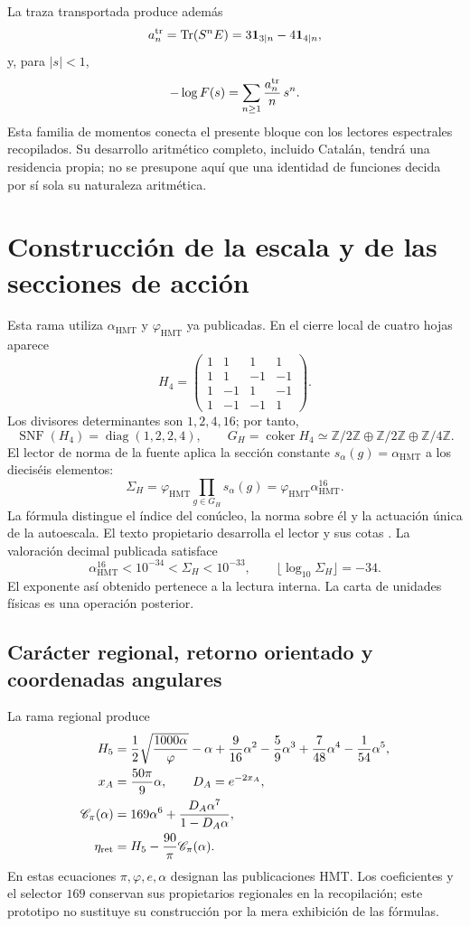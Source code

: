 \documentclass[11pt,a4paper]{article}
\numberwithin{equation}{section}
\theoremstyle{definition}
\newcommand{\HMT}{\mathrm{HMT}}
\newcommand{\Tr}{\operatorname{Tr}}
\newcommand{\Z}{\mathbb Z}
\begin{document}
La traza transportada produce además
\[
a_n^{\rm tr}=\Tr(S^nE)=3\mathbf1_{3\mid n}-4\mathbf1_{4\mid n},
\]
y, para $|s|<1$,
\[
-\log F(s)=\sum_{n\ge1}\frac{a_n^{\rm tr}}n\,s^n.
\]
Esta familia de momentos conecta el presente bloque con los lectores
espectrales recopilados. Su desarrollo aritmético completo, incluido
Catalán, tendrá una residencia propia; no se presupone aquí que una
identidad de funciones decida por sí sola su naturaleza aritmética.

\section{Construcción de la escala y de las secciones de acción}
\label{sec:action}
Esta rama utiliza $\alpha_{\HMT}$ y $\varphi_{\HMT}$ ya publicadas.
En el cierre local de cuatro hojas aparece
\[
H_4=
\begin{pmatrix}
1&1&1&1\\1&1&-1&-1\\1&-1&1&-1\\1&-1&-1&1
\end{pmatrix}.
\]
Los divisores determinantes son $1,2,4,16$; por tanto,
\[
\operatorname{SNF}(H_4)=\operatorname{diag}(1,2,2,4),
\qquad
G_H=\operatorname{coker}H_4\simeq
\Z/2\Z\oplus\Z/2\Z\oplus\Z/4\Z.
\]
El lector de norma de la fuente aplica la sección constante
$s_\alpha(g)=\alpha_{\HMT}$ a los dieciséis elementos:
\begin{equation}
\Sigma_H=\varphi_{\HMT}
\prod_{g\in G_H}s_\alpha(g)
=\varphi_{\HMT}\alpha_{\HMT}^{16}.
\end{equation}
La fórmula distingue el índice del conúcleo, la norma sobre él y la
actuación única de la autoescala. El texto propietario desarrolla el
lector y sus cotas \cite{accion}. La valoración decimal publicada satisface
\[
\alpha_{\HMT}^{16}<10^{-34}
<\Sigma_H<10^{-33},
\qquad \lfloor\log_{10}\Sigma_H\rfloor=-34.
\]
El exponente así obtenido pertenece a la lectura interna. La carta
de unidades físicas es una operación posterior.

\subsection{Carácter regional, retorno orientado y coordenadas angulares}
La rama regional produce \cite{retorno}
\begin{align}
H_5={}&\frac12\sqrt{\frac{1000\alpha}{\varphi}}-\alpha
+\frac9{16}\alpha^2-\frac59\alpha^3
+\frac7{48}\alpha^4-\frac1{54}\alpha^5,\\
x_A={}&\frac{50\pi}{9}\alpha,\qquad D_A=e^{-2x_A},\\
\mathscr C_\pi(\alpha)={}&169\alpha^6+
\frac{D_A\alpha^7}{1-D_A\alpha},\\
\eta_{\rm ret}={}&H_5-\frac{90}{\pi}\mathscr C_\pi(\alpha).
\end{align}
En estas ecuaciones $\pi,\varphi,e,\alpha$ designan las publicaciones
HMT. Los coeficientes y el selector $169$ conservan sus propietarios
regionales en la recopilación; este prototipo no sustituye su construcción
por la mera exhibición de las fórmulas.
\end{document}
